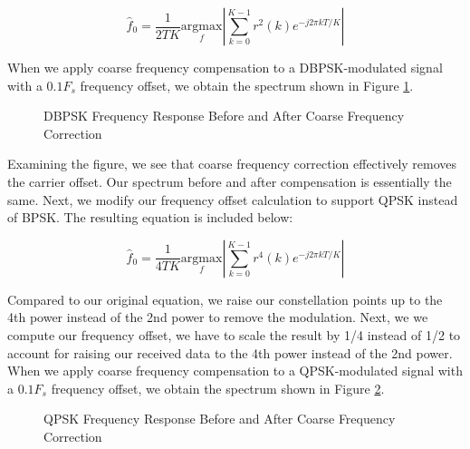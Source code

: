\documentclass{article}
\begin{document}
\begin{equation}
	\hat{f}_0 = \frac{1}{2TK}\underset{f}{\text{argmax}}\left\vert\sum_{k=0}^{K-1}{r^2(k)e^{-j2{\pi}kT/K}}\right\vert
\end{equation}
	
\noindent When we apply coarse frequency compensation to a DBPSK-modulated signal with a $0.1F_s$ frequency offset, we obtain the spectrum shown in Figure \ref{fig::psd_bpsk_with_cfc}.

\begin{figure}[H]
	\centerline{}
	\caption{DBPSK Frequency Response Before and After Coarse Frequency Correction}
	\label{fig::psd_bpsk_with_cfc}
\end{figure}

\noindent Examining the figure, we see that coarse frequency correction effectively removes the carrier offset. Our spectrum before and after compensation is essentially the same. Next, we modify our frequency offset calculation to support QPSK instead of BPSK. The resulting equation is included below:

\begin{equation}
	\hat{f}_0 = \frac{1}{4TK}\underset{f}{\text{argmax}}\left\vert\sum_{k=0}^{K-1}{r^4(k)e^{-j2{\pi}kT/K}}\right\vert
\end{equation}

\noindent Compared to our original equation, we raise our constellation points up to the 4th power instead of the 2nd power to remove the modulation. Next, we we compute our frequency offset, we have to scale the result by 1/4 instead of 1/2 to account for raising our received data to the 4th power instead of the 2nd power. When we apply coarse frequency compensation to a QPSK-modulated signal with a $0.1F_s$ frequency offset, we obtain the spectrum shown in Figure \ref{fig::psd_qpsk_with_cfc}.
 
\begin{figure}[H]
	\centerline{}
	\caption{QPSK Frequency Response Before and After Coarse Frequency Correction}
	\label{fig::psd_qpsk_with_cfc}
\end{figure}
\end{document}
